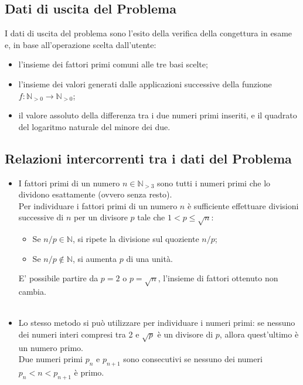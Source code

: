 \documentclass[10pt]{report}
\begin{document}
\subsection{Dati di uscita del Problema}
I dati di uscita del problema sono l'esito della verifica della congettura in esame e, in base all'operazione scelta dall'utente:

\begin{itemize}
\item l'insieme dei fattori primi comuni alle tre basi scelte; 
\item l'insieme dei valori generati dalle applicazioni successive della funzione\\ $f:\mathbb{N}_{>0}\longrightarrow\mathbb{N}_{>0}$; 
\item il valore assoluto della differenza tra i due numeri primi inseriti, e il quadrato del logaritmo naturale del minore dei due. 
\end{itemize}

\subsection{Relazioni intercorrenti tra i dati del Problema}
\begin{itemize}
    \item I fattori primi di un numero $n \in \mathbb{N}_{>3}$ sono tutti i numeri primi che lo dividono esattamente (ovvero senza resto).\\
    Per individuare i fattori primi di un numero $n$ è sufficiente effettuare
    divisioni successive di $n$ per un divisore $p$ tale che $1<p\le\sqrt{n}$:
    \begin{itemize}
        \item Se $n/p \in \mathbb{N}$, si ripete la divisione sul quoziente $n/p$;
        \item Se $n/p \notin \mathbb{N}$, si aumenta $p$ di una unità.
    \end{itemize}
    E' possibile partire da $p=2$ o $p=\sqrt{n}$, l'insieme di fattori ottenuto non cambia.
    \\
    \\
    \item Lo stesso metodo si può utilizzare per individuare i numeri primi: se nessuno dei numeri interi compresi tra 2 e $\sqrt{p}$ è un divisore di $p$, allora quest'ultimo è un numero primo.\\
    Due numeri primi $p_n$ e $p_{n+1}$ sono consecutivi se nessuno dei numeri $p_n<n<p_{n+1}$ è primo. 
    \end{itemize}
\end{document}

